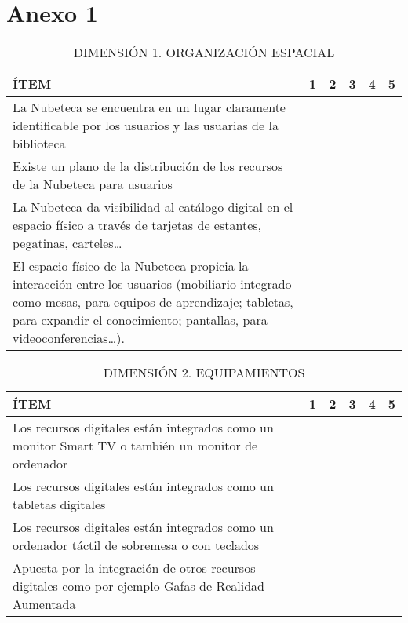 \documentclass[spanish]{textolivre}
\begin{document}
\appendix 
\section{Anexo 1}\label{apx-longtable}

\begin{small}
\centering
\begin{longtable}{p{8cm} |l|l|l|l|l}
\caption{DIMENSIÓN 1. ORGANIZACIÓN ESPACIAL}
\label{longtbl-01}
\\
\toprule
ÍTEM & 1 & 2 & 3 & 4 & 5 \\
\midrule
La Nubeteca se encuentra en un lugar claramente identificable por los usuarios y las usuarias de la biblioteca & & & & & \\
\midrule
Existe un plano de la distribución de los recursos de la Nubeteca para usuarios & & & & & \\
\midrule
La Nubeteca da visibilidad al catálogo digital en el espacio físico a través de tarjetas de estantes, pegatinas, carteles… & & & & & \\
\midrule
El espacio físico de la Nubeteca propicia la interacción entre los usuarios (mobiliario integrado como mesas, para equipos de aprendizaje; tabletas, para expandir el conocimiento; pantallas, para videoconferencias…). & & & & & \\
\bottomrule
\end{longtable}
\end{small}

\begin{small}
\centering
\begin{longtable}{p{8cm} |l|l|l|l|l}
\caption{DIMENSIÓN 2. EQUIPAMIENTOS}
\label{longtbl-02}
\\
\toprule
ÍTEM & 1 & 2 & 3 & 4 & 5 \\
\midrule
Los recursos digitales están integrados como un monitor Smart TV o también un monitor de ordenador & & & & & \\
\midrule
Los recursos digitales están integrados como un tabletas digitales & & & & & \\
\midrule
Los recursos digitales están integrados como un ordenador táctil de sobremesa o con teclados & & & & & \\
\midrule
Apuesta por la integración de otros recursos digitales  como por ejemplo Gafas de Realidad Aumentada & & & & & \\
\bottomrule
\end{longtable}
\end{small}
\end{document}
